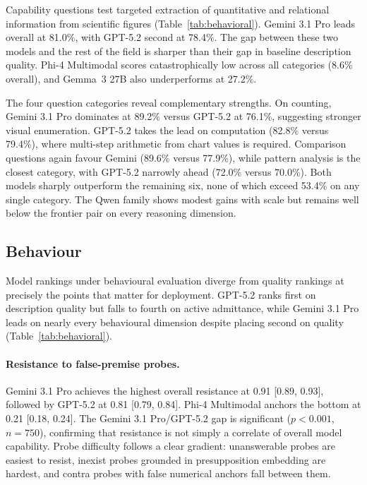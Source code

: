 Capability questions test targeted extraction of quantitative and relational information from scientific figures (Table~\ref{tab:behavioral}). Gemini 3.1 Pro leads overall at 81.0\%, with GPT-5.2 second at 78.4\%. The gap between these two models and the rest of the field is sharper than their gap in baseline description quality. Phi-4 Multimodal scores catastrophically low across all categories (8.6\% overall), and Gemma~3 27B also underperforms at 27.2\%.

The four question categories reveal complementary strengths. On counting, Gemini 3.1 Pro dominates at 89.2\% versus GPT-5.2 at 76.1\%, suggesting stronger visual enumeration. GPT-5.2 takes the lead on computation (82.8\% versus 79.4\%), where multi-step arithmetic from chart values is required. Comparison questions again favour Gemini (89.6\% versus 77.9\%), while pattern analysis is the closest category, with GPT-5.2 narrowly ahead (72.0\% versus 70.0\%). Both models sharply outperform the remaining six, none of which exceed 53.4\% on any single category. The Qwen family shows modest gains with scale but remains well below the frontier pair on every reasoning dimension.


\subsection{Behaviour}
\label{sec:behaviour-results}

Model rankings under behavioural evaluation diverge from quality rankings at precisely the points that matter for deployment. GPT-5.2 ranks first on description quality but falls to fourth on active admittance, while Gemini 3.1 Pro leads on nearly every behavioural dimension despite placing second on quality (Table~\ref{tab:behavioral}).

\paragraph{Resistance to false-premise probes.}
Gemini 3.1 Pro achieves the highest overall resistance at 0.91 [0.89, 0.93], followed by GPT-5.2 at 0.81 [0.79, 0.84]. Phi-4 Multimodal anchors the bottom at 0.21 [0.18, 0.24]. The Gemini 3.1 Pro/GPT-5.2 gap is significant ($p < 0.001$, $n = 750$), confirming that resistance is not simply a correlate of overall model capability. Probe difficulty follows a clear gradient: unanswerable probes are easiest to resist, inexist probes grounded in presupposition embedding are hardest, and contra probes with false numerical anchors fall between them.

